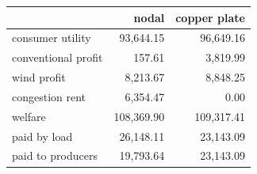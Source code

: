\begin{tabular}{lrr}
\toprule
 & nodal & copper plate \\
\midrule
consumer utility & 93,644.15 & 96,649.16 \\
conventional profit & 157.61 & 3,819.99 \\
wind profit & 8,213.67 & 8,848.25 \\
congestion rent & 6,354.47 & 0.00 \\
welfare & 108,369.90 & 109,317.41 \\
paid by load & 26,148.11 & 23,143.09 \\
paid to producers & 19,793.64 & 23,143.09 \\
\bottomrule
\end{tabular}
